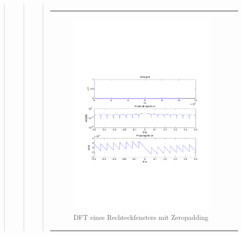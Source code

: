 \begin{quote}
\begin{quote}
\begin{quote}
\begin{center}
\begin{tabular}{ll}
                \end{tabular}
                \end{center}
    
                \begin{center}
                \begin{tabular}{ll}
    
                \hspace{-11em}
                    \begin{minipage}{0.6\textwidth}
    
                        \begin{figure}[H]
                            \label{fig:}
                            \includegraphics[scale=0.5, trim = 1.5cm 7cm 1.5cm 8cm, clip]{./Bilder/RechteckDFTzeropadding} %
                            \caption{DFT eines Rechteckfensters mit Zeropadding}
                        \end{figure}
    

\end{minipage}
\end{tabular}
\end{center}
\end{quote}
\end{quote}
\end{quote}
